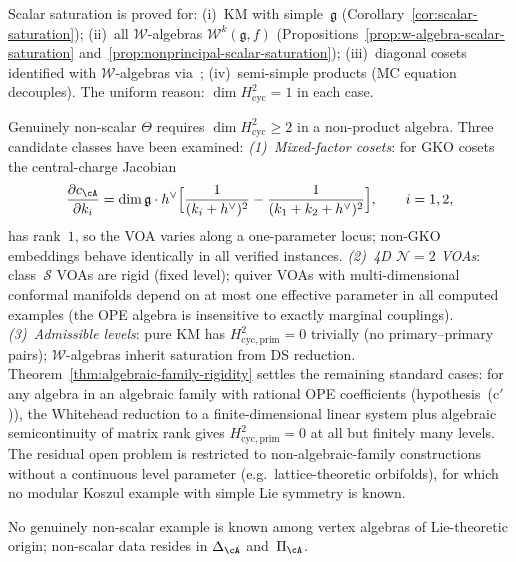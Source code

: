 \begin{remark}
\label{rem:scalar-saturation-scope}
Scalar saturation is proved for:
(i)~KM with simple~$\mathfrak{g}$ (Corollary~\ref{cor:scalar-saturation});
(ii)~all $\mathcal{W}$-algebras $\mathcal{W}^k(\mathfrak{g},f)$
(Propositions~\ref{prop:w-algebra-scalar-saturation}
and~\ref{prop:nonprincipal-scalar-saturation});
(iii)~diagonal cosets identified with $\mathcal{W}$-algebras via~\cite{ACL19};
(iv)~semi-simple products (MC equation decouples).
The uniform reason: $\dim H^2_{\mathrm{cyc}} = 1$ in each case.

Genuinely non-scalar $\Theta$ requires $\dim H^2_{\mathrm{cyc}} \geq 2$
in a non-product algebra.  Three candidate classes have been examined:
\emph{(1)~Mixed-factor cosets}: for GKO cosets the central-charge Jacobian
\[
\frac{\partial c_{\cA}}{\partial k_i}
= \dim\mathfrak{g} \cdot h^\vee
\Bigl[\frac{1}{(k_i + h^\vee)^2}
- \frac{1}{(k_1 + k_2 + h^\vee)^2}\Bigr],
\qquad i = 1, 2,
\]
has rank~$1$, so the VOA varies along a one-parameter locus;
non-GKO embeddings behave identically in all verified instances.
\emph{(2)~4D $\mathcal{N}=2$ VOAs}: class~$\mathcal{S}$ VOAs are rigid
(fixed level); quiver VOAs with multi-dimensional conformal manifolds
depend on at most one effective parameter in all computed examples
(the OPE algebra is insensitive to exactly marginal couplings).
\emph{(3)~Admissible levels}: pure KM has
$H^2_{\mathrm{cyc,prim}} = 0$ trivially (no primary--primary pairs);
$\mathcal{W}$-algebras inherit saturation from DS reduction.
Theorem~\ref{thm:algebraic-family-rigidity} settles the
remaining standard cases: for any algebra in an algebraic family
with rational OPE coefficients (hypothesis~(c$'$)), the
Whitehead reduction to a finite-dimensional linear system plus
algebraic semicontinuity of matrix rank gives
$H^2_{\mathrm{cyc,prim}} = 0$ at all but finitely many levels.
The residual open problem is restricted to non-algebraic-family
constructions without a continuous level parameter (e.g.\
lattice-theoretic orbifolds), for which no modular Koszul
example with simple Lie symmetry is known.

No genuinely non-scalar example is known among vertex algebras of
Lie-theoretic origin; non-scalar data resides in $\Delta_{\cA}$
and~$\Pi_{\cA}$.
\end{remark}

